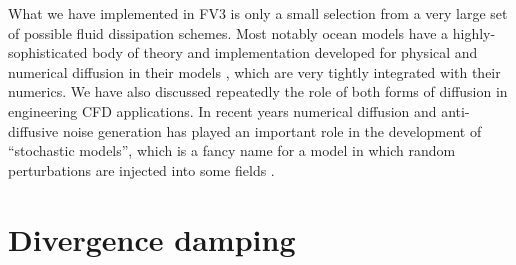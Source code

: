 \documentclass[10pt,letterpaper,margin=1in]{memoir}
\begin{document}
What we have implemented in FV3 is only a small selection from a very large set of possible fluid dissipation schemes.
Most notably ocean models have a highly-sophisticated body of theory and implementation developed for physical and numerical diffusion in their models \citep{Griffies2003}, which are very tightly integrated with their numerics. We have also discussed repeatedly the role of both forms of diffusion in engineering CFD applications. In recent years numerical diffusion and anti-diffusive noise generation has played an important role in the development of ``stochastic models'', which is a fancy name for a model in which random perturbations are injected into some fields \citep{Franzke2015}.

\section{Divergence damping} \label{sec:divdamp}
\end{document}
